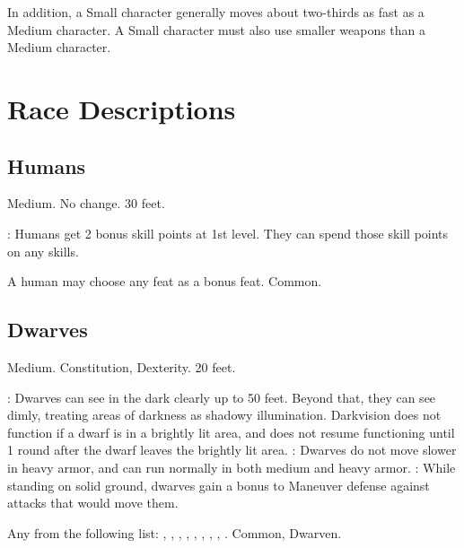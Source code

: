 In addition, a Small character generally moves about two-thirds as fast as a Medium character. A Small character must also use smaller weapons than a Medium character.

\section{Race Descriptions}

\subsection{Humans}
 Medium.
 No change.
 30 feet.
\begin{itemize}
    : Humans get 2 bonus skill points at 1st level. They can spend those skill points on any skills.
\end{itemize}
 A human may choose any feat as a bonus feat.
 Common.

\subsection{Dwarves}
 Medium.
  Constitution,  Dexterity.
 20 feet.
\begin{itemize}
    : Dwarves can see in the dark clearly up to 50 feet.   Beyond that, they can see dimly, treating areas of darkness as shadowy illumination. Darkvision does not function if a dwarf is in a brightly lit area, and does not resume functioning until 1 round after the dwarf leaves the brightly lit area.
    : Dwarves do not move slower in heavy armor, and can run normally in both medium and heavy armor.
    : While standing on solid ground, dwarves gain a  bonus to Maneuver defense against attacks that would move them.
\end{itemize}
 Any from the following list: , , , , , , , , .
 Common, Dwarven.

